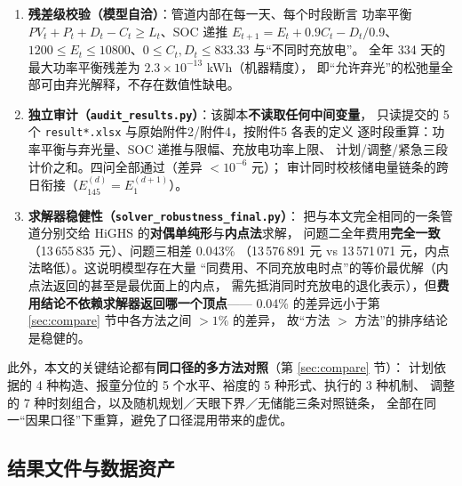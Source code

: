 \begin{enumerate}[label=(\arabic*), leftmargin=2.2em, itemsep=1pt]
\item \textbf{残差级校验（模型自洽）}：管道内部在每一天、每个时段断言
功率平衡 $PV_t+P_t+D_t-C_t\ge L_t$、SOC 递推 $E_{t+1}=E_t+0.9C_t-D_t/0.9$、
$1200\le E_t\le10800$、$0\le C_t,D_t\le833.33$ 与“不同时充放电”。
全年 334 天的最大功率平衡残差为 $2.3\times10^{-13}$ kWh（机器精度），
即“允许弃光”的松弛量全部可由弃光解释，不存在数值性缺电。
\item \textbf{独立审计（\texttt{audit\_results.py}）}：该脚本\textbf{不读取任何中间变量}，
只读提交的 5 个 \texttt{result*.xlsx} 与原始附件2/附件4，按附件5 各表的定义
逐时段重算：功率平衡与弃光量、SOC 递推与限幅、充放电功率上限、
计划/调整/紧急三段计价之和。四问全部通过（差异 $<10^{-6}$ 元）；
审计同时校核储电量链条的跨日衔接（$E_{145}^{(d)}=E_1^{(d+1)}$）。
\item \textbf{求解器稳健性（\texttt{solver\_robustness\_final.py}）}：
把与本文完全相同的一条管道分别交给 HiGHS 的\textbf{对偶单纯形}与\textbf{内点法}求解，
问题二全年费用\textbf{完全一致}（13\,655\,835 元）、问题三相差 0.043\%
（13\,576\,891 元 vs 13\,571\,071 元，内点法略低）。这说明模型存在大量
“同费用、不同充放电时点”的等价最优解（内点法返回的甚至是最优面上的内点，
需先抵消同时充放电的退化表示），但\textbf{费用结论不依赖求解器返回哪一个顶点}——
0.04\% 的差异远小于第 \ref{sec:compare} 节中各方法之间 $>1\%$ 的差异，
故“方法 $>$ 方法”的排序结论是稳健的。
\end{enumerate}

此外，本文的关键结论都有\textbf{同口径的多方法对照}（第 \ref{sec:compare} 节）：
计划依据的 4 种构造、报童分位的 5 个水平、裕度的 5 种形式、执行的 3 种机制、
调整的 7 种时刻组合，以及随机规划／天眼下界／无储能三条对照链条，
全部在同一“因果口径”下重算，避免了口径混用带来的虚优。

\subsection{结果文件与数据资产}

